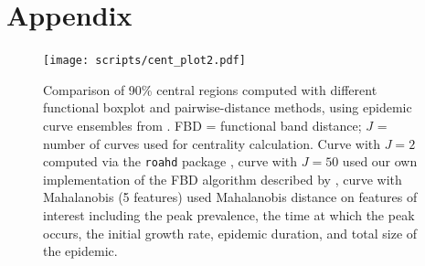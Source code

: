 \documentclass[fleqn,10pt,lineno]{wlpeerj}
\begin{document}


\section*{Appendix}

\begin{figure}[ht]\centering
  \texttt{[image: scripts/cent\_plot2.pdf]}
  \caption{Comparison of 90\% central regions computed with
    different functional boxplot and pairwise-distance methods, using epidemic curve ensembles from \juul. FBD = functional band distance; $J$ = number of curves used for centrality calculation. Curve with $J=2$ computed via the \texttt{roahd} package \citep{roahd}, curve with $J=50$ used our own implementation of the FBD algorithm described by \juul, curve with Mahalanobis (5 features) used Mahalanobis distance on features of interest including the peak prevalence, the time at which the peak occurs, the initial growth rate, epidemic duration, and total size of the epidemic.
  }
  \label{p.b}
\end{figure}
\end{document}
